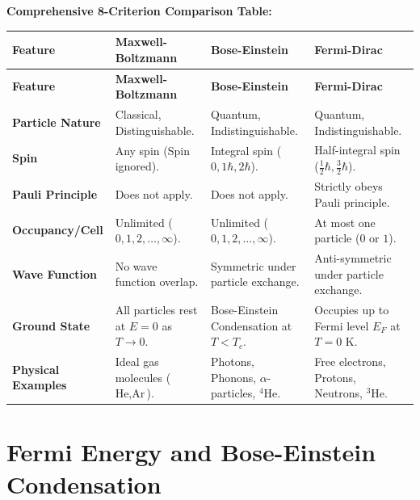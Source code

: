 \documentclass[12pt,a4paper]{article}
\begin{document}
\textbf{Comprehensive 8-Criterion Comparison Table:}\par\vspace{6pt}\noindent
\begingroup
\setlength{\LTleft}{0pt}
\setlength{\LTright}{0pt}
\begin{longtable}{|B{2.8cm}|>{\small\raggedright\arraybackslash}m{\dimexpr(\linewidth-2.8cm-8\arrayrulewidth)/3\relax}|>{\small\raggedright\arraybackslash}m{\dimexpr(\linewidth-2.8cm-8\arrayrulewidth)/3\relax}|>{\small\raggedright\arraybackslash}m{\dimexpr(\linewidth-2.8cm-8\arrayrulewidth)/3\relax}|}
\hline
\textbf{Feature} & \textbf{Maxwell-Boltzmann} & \textbf{Bose-Einstein} & \textbf{Fermi-Dirac} \\
\hline
\endfirsthead
\hline
\textbf{Feature} & \textbf{Maxwell-Boltzmann} & \textbf{Bose-Einstein} & \textbf{Fermi-Dirac} \\
\hline
\endhead
\textbf{Particle Nature} & Classical, Distinguishable. & Quantum, Indistinguishable. & Quantum, Indistinguishable. \\
\hline
\textbf{Spin} & Any spin (Spin ignored). & Integral spin ($0, 1\hbar, 2\hbar$). & Half-integral spin ($\frac{1}{2}\hbar, \frac{3}{2}\hbar$). \\
\hline
\textbf{Pauli Principle} & Does not apply. & Does not apply. & Strictly obeys Pauli principle. \\
\hline
\textbf{Occupancy/Cell} & Unlimited ($0, 1, 2, \ldots, \infty$). & Unlimited ($0, 1, 2, \ldots, \infty$). & At most one particle ($0$ or $1$). \\
\hline
\textbf{Wave Function} & No wave function overlap. & Symmetric under particle exchange. & Anti-symmetric under particle exchange. \\
\hline
\textbf{Ground State} & All particles rest at $E=0$ as $T \to 0$. & Bose-Einstein Condensation at $T < T_c$. & Occupies up to Fermi level $E_F$ at $T=0\text{ K}$. \\
\hline
\textbf{Physical Examples} & Ideal gas molecules ($\text{He}, \text{Ar}$). & Photons, Phonons, $\alpha$-particles, $^4\text{He}$. & Free electrons, Protons, Neutrons, $^3\text{He}$. \\
\hline
\end{longtable}
\endgroup

\section{Fermi Energy and Bose-Einstein Condensation}
\end{document}
